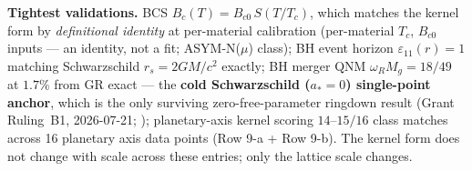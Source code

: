\textbf{Tightest validations.} BCS $B_c(T) = B_{c0}\, S(T/T_c)$, which matches the kernel form by \emph{definitional identity} at per-material calibration (per-material $T_c$, $B_{c0}$ inputs --- an identity, not a fit; ASYM-N($\mu$) class); BH event horizon $\varepsilon_{11}(r) = 1$ matching Schwarzschild $r_s = 2GM/c^2$ exactly; BH merger QNM $\omega_R M_g = 18/49$ at $1.7\%$ from GR exact --- the \textbf{cold Schwarzschild ($a_* = 0$) single-point anchor}, which is the only surviving zero-free-parameter ringdown result (Grant Ruling~B1, 2026-07-21; ); planetary-axis kernel scoring $14$--$15/16$ class matches across 16 planetary axis data points (Row 9-a + Row 9-b). The kernel form does not change with scale across these entries; only the lattice scale changes.

